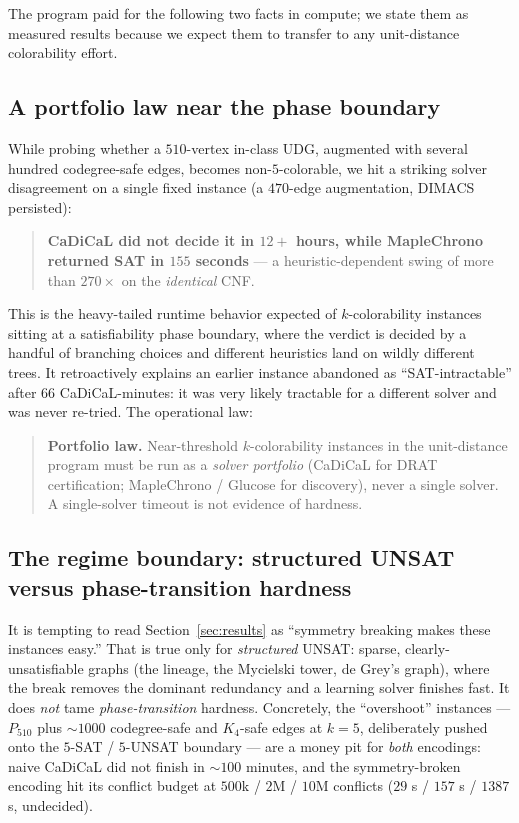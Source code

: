 \documentclass[11pt]{article}
\theoremstyle{definition}
\begin{document}
The program paid for the following two facts in compute; we state them as measured
results because we expect them to transfer to any unit-distance colorability
effort.

\subsection{A portfolio law near the phase boundary}
\label{sec:portfolio}

While probing whether a $510$-vertex in-class UDG, augmented with several hundred
codegree-safe edges, becomes non-$5$-colorable, we hit a striking solver
disagreement on a single fixed instance (a $470$-edge augmentation, DIMACS
persisted):
\begin{quote}
\textbf{CaDiCaL did not decide it in $12{+}$ hours, while MapleChrono returned
SAT in $155$ seconds} --- a heuristic-dependent swing of more than $270\times$ on
the \emph{identical} CNF.
\end{quote}
This is the heavy-tailed runtime behavior expected of $k$-colorability instances
sitting at a satisfiability phase boundary, where the verdict is decided by a
handful of branching choices and different heuristics land on wildly different
trees. It retroactively explains an earlier instance abandoned as
``SAT-intractable'' after $66$ CaDiCaL-minutes: it was very likely tractable for a
different solver and was never re-tried. The operational law:

\begin{quote}
\textbf{Portfolio law.} Near-threshold $k$-colorability instances in the
unit-distance program must be run as a \emph{solver portfolio} (CaDiCaL for DRAT
certification; MapleChrono / Glucose for discovery), never a single solver. A
single-solver timeout is not evidence of hardness.
\end{quote}

\subsection{The regime boundary: structured UNSAT versus phase-transition hardness}
\label{sec:boundary}

It is tempting to read Section~\ref{sec:results} as ``symmetry breaking makes
these instances easy.'' That is true only for \emph{structured} UNSAT: sparse,
clearly-unsatisfiable graphs (the lineage, the Mycielski tower, de Grey's graph),
where the break removes the dominant redundancy and a learning solver finishes
fast. It does \emph{not} tame \emph{phase-transition} hardness. Concretely, the
``overshoot'' instances --- $P_{510}$ plus $\sim\!1000$ codegree-safe and
$K_4$-safe edges at $k=5$, deliberately pushed onto the $5$-SAT / $5$-UNSAT
boundary --- are a money pit for \emph{both} encodings: naive CaDiCaL did not
finish in $\sim\!100$ minutes, and the symmetry-broken encoding hit its conflict
budget at $500$k / $2$M / $10$M conflicts ($29$ s / $157$ s / $1387$ s,
undecided).
\end{document}
